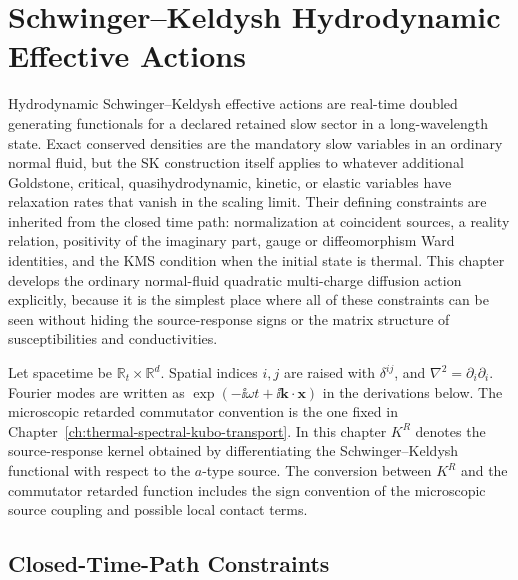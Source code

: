 \chapter{Schwinger--Keldysh Hydrodynamic Effective Actions}
\label{ch:thermal-sk-hydrodynamic-effective-actions}

\ConventionsRealTime

Hydrodynamic Schwinger--Keldysh effective actions are real-time doubled
generating functionals for a declared retained slow sector in a
long-wavelength state.  Exact conserved densities are the mandatory slow
variables in an ordinary normal fluid, but the SK construction itself applies
to whatever additional Goldstone, critical, quasihydrodynamic, kinetic, or
elastic variables have relaxation rates that vanish in the scaling limit.
Their defining constraints are inherited from the closed time path:
normalization at coincident sources, a reality relation, positivity of the
imaginary part, gauge or diffeomorphism Ward identities, and the KMS condition
when the initial state is thermal.  This chapter develops the ordinary
normal-fluid quadratic multi-charge diffusion action explicitly, because it is
the simplest place where all of these constraints can be seen without hiding
the source-response signs or the matrix structure of susceptibilities and
conductivities.

Let spacetime be \(\mathbb R_t\times\mathbb R^d\).  Spatial indices
\(i,j\) are raised with \(\delta^{ij}\), and
\(\nabla^2=\partial_i\partial_i\).  Fourier modes are written as
\(\exp(-\ii\omega t+\ii\mathbf k\cdot\mathbf x)\) in the derivations below.
The microscopic retarded commutator convention is the one fixed in
Chapter~\ref{ch:thermal-spectral-kubo-transport}.  In this chapter
\(K^R\) denotes the source-response kernel obtained by differentiating the
Schwinger--Keldysh functional with respect to the \(a\)-type source.  The
conversion between \(K^R\) and the commutator retarded function includes the
sign convention of the microscopic source coupling and possible local contact
terms.

\section{Closed-Time-Path Constraints}

